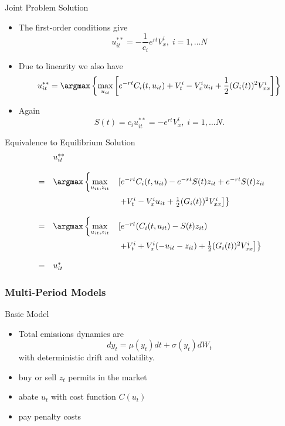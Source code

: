 {Joint Problem Solution}
\begin{itemize}
\item<1-> The first-order conditions give
$$
u_{it}^{**}= -\frac{1}{c_i} e^{rt} V^i_x, \; i=1, \ldots N
$$
\item<2-> Due to linearity we also have
$$
u_{it}^{**}= \argmax \left\{ \max_{u_{it}} \left[e^{-rt} C_i(t,u_{it}) + V^i_t -V_x^iu_{it} + \frac{1}{2}(G_i(t))^2 V^i_{xx}\right]
\right\}
$$
\item<3-> Again
$$
S(t) = c_i u_{it}^{**}= -e^{rt}V^i_x, \; i=1, \ldots N.
$$
\end{itemize}



{Equivalence to Equilibrium Solution}
$$
\begin{array}{lll}
&u_{it}^{**}&\\*[12pt]
=&  \argmax \left\{ \displaystyle \max_{u_{it},z_{it}} \right. &\left[e^{-rt} C_i(t,u_{it}) -e^{-rt}S(t)z_{it} +e^{-rt}S(t)z_{it} \right.\\*[12pt]
 &&\left.\left. + V^i_t -V_x^iu_{it} + \frac{1}{2}(G_i(t))^2 V^i_{xx}\right]
\right\}\\*[12pt]
=&  \argmax \left\{ \displaystyle \max_{u_{it},z_{it}} \right. &\left[e^{-rt} (C_i(t,u_{it}) -S(t)z_{it}) \right. \\*[12pt]
&&\left.\left. + V^i_t +V_x^i(-u_{it}-z_{it}) + \frac{1}{2}(G_i(t))^2 V^i_{xx}\right]
\right\}\\*[12pt]
=&u_{it}^*&
\end{array}
$$

\subsubsection{Multi-Period Models}

{Basic Model}
\begin{itemize}
\item<1-> Total emissions dynamics are
\begin{equation}
dy_t= \mu(y_t)dt + \sigma(y_t)dW_t
\end{equation}
with deterministic drift and volatility.
\item<2-> buy or sell $z_t$  permits in the market
\item<3-> abate $u_t$ with cost function $C(u_t)$
\item<4-> pay penalty costs
\end{itemize}



